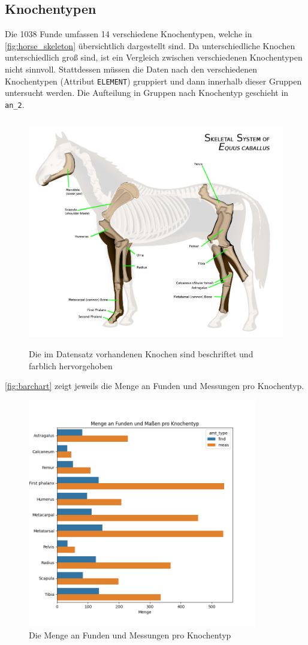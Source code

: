 \subsection{Knochentypen}
Die 1038 Funde umfassen 14 verschiedene Knochentypen, welche in  \autoref{fig:horse_skeleton} \cite{WikiSkeletalHorse} übersichtlich dargestellt sind.
Da unterschiedliche Knochen unterschiedlich groß sind, ist ein Vergleich zwischen verschiedenen Knochentypen nicht sinnvoll. 
Stattdessen müssen die Daten nach den verschiedenen Knochentypen (Attribut \texttt{ELEMENT}) gruppiert und dann innerhalb dieser Gruppen untersucht werden.
Die Aufteilung in Gruppen nach Knochentyp geschieht in \texttt{an\_2}. 

\begin{figure}[H]
    \centering
    \includegraphics[height=10cm]{docs/attachments/ab-project_Horse-anatomy.png}
    \caption{Die im Datensatz vorhandenen Knochen sind beschriftet und farblich hervorgehoben}
    \label{fig:horse_skeleton}
\end{figure}

\autoref{fig:barchart} zeigt jeweils die Menge an Funden und Messungen pro Knochentyp.

\begin{figure}[H]
    \centering
    \includegraphics[height=10cm]{results/plots/amounts_barchart.png}
    \caption{Die Menge an Funden und Messungen pro Knochentyp}
    \label{fig:barchart}
\end{figure}
